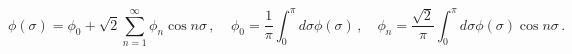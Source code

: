 \begin{equation}
\phi (\sigma )=\phi _{0}+\sqrt{2}\sum_{n=1}^{\infty }\phi _{n}\cos n\sigma
\,,~~~~~\phi _{0}={\frac{1}{\pi }}\int_{0}^{\pi }d\sigma \phi (\sigma
)\,,\quad \phi _{n}={\frac{\sqrt{2}}{\pi }}\int_{0}^{\pi }d\sigma \phi
(\sigma )\cos n\sigma \,.~~~~~~~
\end{equation}


